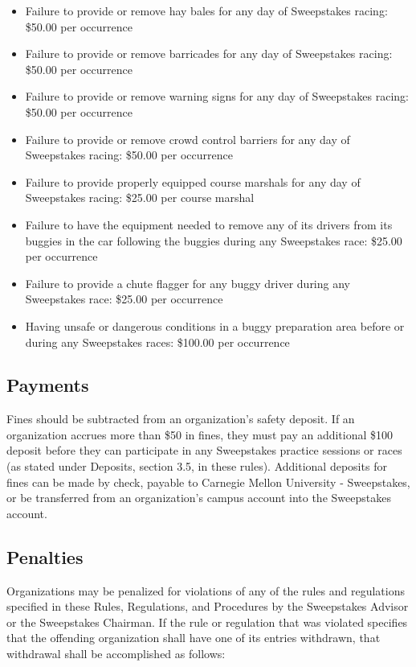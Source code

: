 \begin{itemize}
	\item Failure to provide or remove hay bales for any day of Sweepstakes racing: \$50.00 per occurrence
	\item Failure to provide or remove barricades for any day of Sweepstakes racing: \$50.00 per occurrence
	\item Failure to provide or remove warning signs for any day of Sweepstakes racing: \$50.00 per occurrence
	\item Failure to provide or remove crowd control barriers for any day of Sweepstakes racing: \$50.00 per occurrence
	\item Failure to provide properly equipped course marshals for any day of Sweepstakes racing: \$25.00 per course marshal
	\item Failure to have the equipment needed to remove any of its drivers from its buggies in the car following the buggies during any Sweepstakes race: \$25.00 per occurrence
	\item Failure to provide a chute flagger for any buggy driver during any Sweepstakes race: \$25.00 per occurrence
	\item Having unsafe or dangerous conditions in a buggy preparation area before or during any Sweepstakes races: \$100.00 per occurrence
\end{itemize}

\subsection{Payments}

Fines should be subtracted from an organization's safety deposit. If an organization accrues more than \$50 in fines, they must pay an additional \$100 deposit before they can participate in any Sweepstakes practice sessions or races (as stated under Deposits, section 3.5, in these rules). Additional deposits for fines can be made by check, payable to Carnegie Mellon University - Sweepstakes, or be transferred from an organization's campus account into the Sweepstakes account.

\subsection{Penalties}
Organizations may be penalized for violations of any of the rules and regulations specified in these Rules, Regulations, and Procedures by the Sweepstakes Advisor or the Sweepstakes Chairman. If the rule or regulation that was violated specifies that the offending organization shall have one of its entries withdrawn, that withdrawal shall be accomplished as follows:

